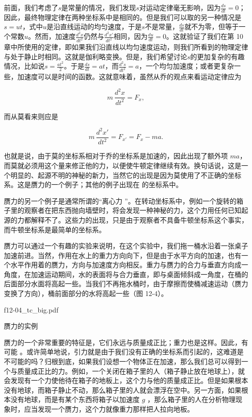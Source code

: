\documentclass[12pt,oneside]{book}
\begin{document}
前面，我们考虑了$s$是常量的情况，我们发现$s$对运动定律毫无影响，因为$\frac{ds}{dt} = 0$；因此，最终物理定律在两种坐标系中是相同的。但是我们可以取的另一种情况是$s = ut$，式中$u$是沿直线运动的均匀速度，于是$s$不是常量，$\frac{ds}{dt}$就不为零，但等于一个常数$u$。然而，加速度$\frac{d^2x}{dt^2}$仍然与$\frac{d^2x'}{dt^2}$相同，因为$\frac{du}{dt} = 0$。这就验证了我们在第 10 章中所使用的定律，即如果我们沿直线以均匀速度运动，则我们所看到的物理定律与处于静止时相同。这就是伽利略变换。但是，我们希望讨论$s$的更加复杂的有趣情况，比如说$s = \frac{at^2}{2}$。于是$\frac{ds}{dt} = at$，而$\frac{d^2s}{dt^2} = a$，一个均匀加速度；或者更复杂一些，加速度可以是时间的函数。这就意味着，虽然从乔的观点来看运动定律应为


\begin{equation*}
m\,\frac{d^2x}{dt^2}=F_x,
\end{equation*}

而从莫看来则应是


\begin{equation*}
m\,\frac{d^2x'}{dt^2}=F_{x'}=F_x-ma.
\end{equation*}

也就是说，由于莫的坐标系相对于乔的坐标系是加速的，因此出现了额外项  $ma  $，而莫就必须用这个量来修正他的力，以便使牛顿定律继续有效。换句话说，这是一个明显的、起源不明的神秘的新力，当然它的出现是因为莫使用了不正确的坐标系。这是赝力的一个例子；其他的例子出现在  的坐标系中。


赝力的另一个例子是通常所谓的“离心力 ”。在转动坐标系中，例如一个旋转的箱子里的观察者在把东西抛向墙壁时，将会发现一种神秘的力，这个力用任何已知起源的力都解释不了。这些力的出现，只是由于观察者不具备牛顿坐标系这个事实，而牛顿坐标系是最简单的坐标系。


赝力可以通过一个有趣的实验来说明，在这个实验中，我们拖一桶水沿着一张桌子加速前进。当然，作用在水上的重力方向向下，但是由于水平方向的加速，也有一个水平作用着的赝力，方向与加速度方向相反。重力与赝力的合力与垂直方向成一角度，在加速运动期间，水的表面将与合力垂直，即与桌面倾斜成一角度，在桶的后面部分水面将高起一些。当我们不再拖水桶时，由于摩擦而使桶减速运动（赝力变换了方向），桶前面部分的水将高起一些（图 12-4）。

\begin{fig}{f12-04_tc_big.pdf}
\caption{赝力的实例}
\label{fig:12-4}
\end{fig}


赝力的一个非常重要的特征是，它们永远与质量成正比；重力也是这样。因此，有可能 。或许简单地说，引力就是由于我们没有正确的坐标系而引起的，这难道是不可能的吗？归根到底，如果我们设想一个物体正在加速，那么我们总可以得到一个与质量成正比的力。例如，一个关闭在箱子里的人（箱子静止放在地球上），就会发现有一个力使他待在箱子的地板上，这个力与他的质量成正比。但是如果根本没有地球，而箱子静止不动，那么箱子里的人就会漂浮在空中。另一方面，如果根本没有地球，而是有某个东西将箱子以加速度 $ g $ ，那么箱子里的人在分析物理现象时，应当发现一个赝力，这个力就像重力那样把人拉向地板。
\end{document}
